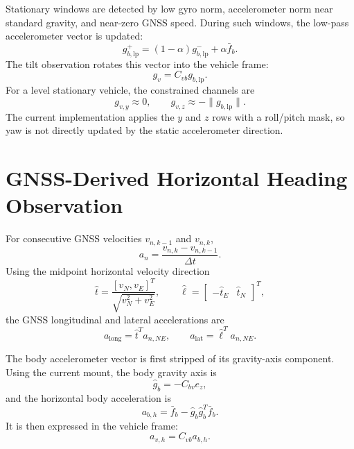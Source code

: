 \documentclass[11pt]{article}
\newcommand{\T}{^{T}}
\begin{document}
Stationary windows are detected by low gyro norm, accelerometer norm near
standard gravity, and near-zero GNSS speed. During such windows, the low-pass
accelerometer vector is updated:
\begin{equation}
  g_{b,\mathrm{lp}}^{+}
  =(1-\alpha)g_{b,\mathrm{lp}}^{-}+\alpha\bar f_b .
\end{equation}
The tilt observation rotates this vector into the vehicle frame:
\begin{equation}
  g_v=C_{vb}g_{b,\mathrm{lp}} .
\end{equation}
For a level stationary vehicle, the constrained channels are
\begin{equation}
  g_{v,y}\approx 0,\qquad g_{v,z}\approx -\|g_{b,\mathrm{lp}}\|.
\end{equation}
The current implementation applies the \(y\) and \(z\) rows with a roll/pitch
mask, so yaw is not directly updated by the static accelerometer direction.

\section{GNSS-Derived Horizontal Heading Observation}

For consecutive GNSS velocities \(v_{n,k-1}\) and \(v_{n,k}\),
\begin{equation}
  a_n=\frac{v_{n,k}-v_{n,k-1}}{\Delta t}.
\end{equation}
Using the midpoint horizontal velocity direction
\begin{equation}
  \hat t=\frac{[v_N,v_E]\T}{\sqrt{v_N^2+v_E^2}},
  \qquad
  \hat \ell=\begin{bmatrix}-\hat t_E & \hat t_N\end{bmatrix}\T ,
\end{equation}
the GNSS longitudinal and lateral accelerations are
\begin{equation}
  a_{\mathrm{long}}=\hat t\T a_{n,NE},
  \qquad
  a_{\mathrm{lat}}=\hat\ell\T a_{n,NE}.
\end{equation}

The body accelerometer vector is first stripped of its gravity-axis component.
Using the current mount, the body gravity axis is
\begin{equation}
  \hat g_b=-C_{bv}e_z,
\end{equation}
and the horizontal body acceleration is
\begin{equation}
  a_{b,h}=\bar f_b-\hat g_b\hat g_b\T\bar f_b .
\end{equation}
It is then expressed in the vehicle frame:
\begin{equation}
  a_{v,h}=C_{vb}a_{b,h}.
\end{equation}
\end{document}
